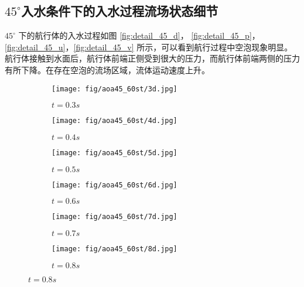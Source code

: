 \subsection{$45 ^\circ$入水条件下的入水过程流场状态细节}

$45 ^\circ$ 下的航行体的入水过程如图 \ref{fig:detail_45_d}， \ref{fig:detail_45_p}，\ref{fig:detail_45_u}，\ref{fig:detail_45_v} 所示，可以看到航行过程中空泡现象明显。航行体接触到水面后，航行体前端正侧受到很大的压力，而航行体前端两侧的压力有所下降。在存在空泡的流场区域，流体运动速度上升。

\begin{figure}[!htp]
  \centering

  \begin{subfigure}{0.25\textwidth}
    \centering
    \texttt{[image: fig/aoa45\_60st/3d.jpg]}
    \caption{$t = 0.3s$}
  \end{subfigure}
  \hspace{1cm}
  \begin{subfigure}{0.25\textwidth}
    \centering
    \texttt{[image: fig/aoa45\_60st/4d.jpg]}
    \caption{$t = 0.4s$}
  \end{subfigure}
  \hspace{1cm}
  \begin{subfigure}{0.25\textwidth}
    \centering
    \texttt{[image: fig/aoa45\_60st/5d.jpg]}
    \caption{$t = 0.5s$}
  \end{subfigure}

  \quad

  \begin{subfigure}{0.25\textwidth}
    \centering
    \texttt{[image: fig/aoa45\_60st/6d.jpg]}
    \caption{$t = 0.6s$}
  \end{subfigure}
  \hspace{1cm}
  \begin{subfigure}{0.25\textwidth}
    \centering
    \texttt{[image: fig/aoa45\_60st/7d.jpg]}
    \caption{$t = 0.7s$}
  \end{subfigure}
  \hspace{1cm}
  \begin{subfigure}{0.25\textwidth}
    \centering
    \texttt{[image: fig/aoa45\_60st/8d.jpg]}
    \caption{$t = 0.8s$}
  \end{subfigure}

  \quad 


\end{figure}
